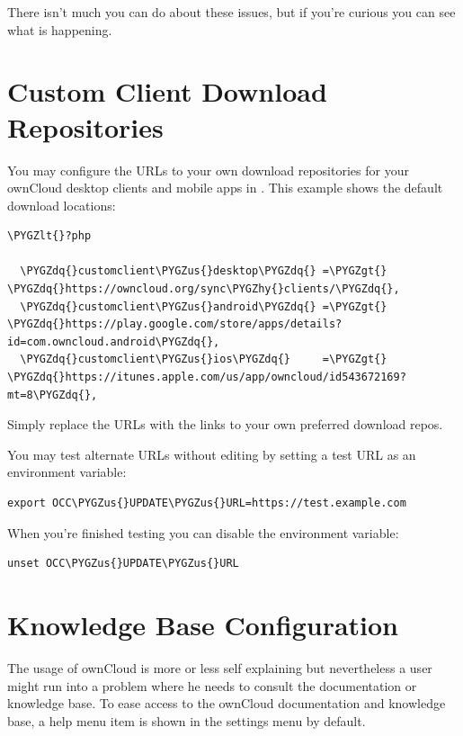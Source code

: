 \documentclass[letterpaper,10pt,english]{sphinxmanual}
\def\PYGZus{\char`\_}
\def\PYGZlt{\char`\<}
\def\PYGZgt{\char`\>}
\def\PYGZhy{\char`\-}
\def\PYGZdq{\char`\"}
\begin{document}
There isn't much you can do about these issues, but if you're curious you can
see what is happening.


\section{Custom Client Download Repositories}
\label{configuration_server/custom_client_repos::doc}\label{configuration_server/custom_client_repos:custom-client-download-repositories}
You may configure the URLs to your own download repositories for your ownCloud
desktop clients and mobile apps in . This example shows
the default download locations:

\begin{Verbatim}[commandchars=\\\{\}]
\PYGZlt{}?php

  \PYGZdq{}customclient\PYGZus{}desktop\PYGZdq{} =\PYGZgt{} \PYGZdq{}https://owncloud.org/sync\PYGZhy{}clients/\PYGZdq{},
  \PYGZdq{}customclient\PYGZus{}android\PYGZdq{} =\PYGZgt{} \PYGZdq{}https://play.google.com/store/apps/details?id=com.owncloud.android\PYGZdq{},
  \PYGZdq{}customclient\PYGZus{}ios\PYGZdq{}     =\PYGZgt{} \PYGZdq{}https://itunes.apple.com/us/app/owncloud/id543672169?mt=8\PYGZdq{},
\end{Verbatim}

Simply replace the URLs with the links to your own preferred download repos.

You may test alternate URLs without editing  by setting a test URL as an environment variable:

\begin{Verbatim}[commandchars=\\\{\}]
export OCC\PYGZus{}UPDATE\PYGZus{}URL=https://test.example.com
\end{Verbatim}

When you're finished testing you can disable the environment variable:

\begin{Verbatim}[commandchars=\\\{\}]
unset OCC\PYGZus{}UPDATE\PYGZus{}URL
\end{Verbatim}


\section{Knowledge Base Configuration}
\label{configuration_server/knowledgebase_configuration:knowledge-base-configuration}\label{configuration_server/knowledgebase_configuration::doc}
The usage of ownCloud is more or less self explaining but nevertheless a user
might run into a problem where he needs to consult the documentation or knowledge base. To ease access to the ownCloud
documentation and knowledge base, a help menu item is shown in the settings menu by default.
\end{document}
